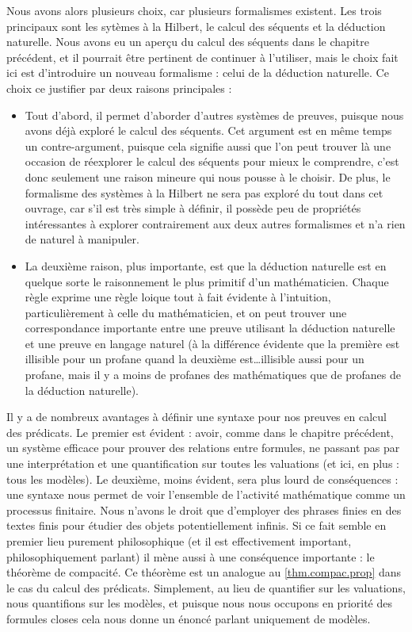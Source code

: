 Nous avons alors plusieurs choix, car plusieurs formalismes existent. Les trois
principaux sont les sytèmes à la Hilbert, le calcul des séquents et la déduction
naturelle. Nous avons eu un aperçu du calcul des séquents dans le chapitre
précédent, et il pourrait être pertinent de continuer à l'utiliser, mais le choix
fait ici est d'introduire un nouveau formalisme : celui de la déduction
naturelle. Ce choix ce justifier par deux raisons principales :
\begin{itemize}
\item Tout d'abord, il permet d'aborder d'autres systèmes de preuves, puisque
  nous avons déjà exploré le calcul des séquents. Cet argument est en même temps
  un contre-argument, puisque cela signifie aussi que l'on peut trouver là une
  occasion de réexplorer le calcul des séquents pour mieux le comprendre, c'est
  donc seulement une raison mineure qui nous pousse à le choisir. De plus, le
  formalisme des systèmes à la Hilbert ne sera pas exploré du tout dans cet
  ouvrage, car s'il est très simple à définir, il possède peu de propriétés
  intéressantes à explorer contrairement aux deux autres formalismes et n'a rien
  de naturel à manipuler.
\item La deuxième raison, plus importante, est que la déduction naturelle est en
  quelque sorte le raisonnement le plus primitif d'un mathématicien. Chaque règle
  exprime une règle loique tout à fait évidente à l'intuition, particulièrement
  à celle du mathématicien, et on peut trouver une correspondance importante
  entre une preuve utilisant la déduction naturelle et une preuve en langage
  naturel (à la différence évidente que la première est illisible pour un profane
  quand la deuxième est\ldots illisible aussi pour un profane, mais il y a moins
  de profanes des mathématiques que de profanes de la déduction naturelle).
\end{itemize}

Il y a de nombreux avantages à définir une syntaxe pour nos preuves en calcul des
prédicats. Le premier est évident : avoir, comme dans le chapitre précédent, un
système efficace pour prouver des relations entre formules, ne passant pas par
une interprétation et une quantification sur toutes les valuations (et ici, en
plus : tous les modèles). Le deuxième, moins évident, sera plus lourd de
conséquences : une syntaxe nous permet de voir l'ensemble de l'activité
mathématique comme un processus finitaire. Nous n'avons le droit que d'employer
des phrases finies en des textes finis pour étudier des objets potentiellement
infinis. Si ce fait semble en premier lieu purement philosophique (et il est
effectivement important, philosophiquement parlant) il mène aussi à une
conséquence importante : le théorème de compacité. Ce théorème est un analogue
au \cref{thm.compac.prop} dans le cas du calcul des prédicats. Simplement, au
lieu de quantifier sur les valuations, nous quantifions sur les modèles, et
puisque nous nous occupons en priorité des formules closes cela nous donne un
énoncé parlant uniquement de modèles.

